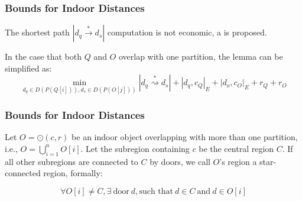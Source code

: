 
\begin{frame}
\frametitle{Bounds for Indoor Distances}

\textrm{The shortest path $|d_q \overset{*}{\rightarrow} d_s|$ computation is not economic, a  is proposed. }

\begin{lemma}
\end{lemma}

\textrm{In the case that both $Q$ and $O$ overlap with one partition, the lemma can be simplified as:}
\begin{equation}
  \min_{d_q \in D(P(Q[i])), d_s \in D(P(O[j]))} |d_q \overset{*}{\rightsquigarrow} d_s| + |d_q, c_Q|_E + |d_o, c_O|_E + r_Q + r_O
  \label{equation:simplified_2}
\end{equation}

\end{frame}


\begin{frame}
\frametitle{Bounds for Indoor Distances}


\begin{definition}

  Let $O = \odot(c, r)$ be an indoor object overlapping with more than one partition, i.e., $O = \bigcup_{i=1}^{n}O[i]$. Let the subregion containing $c$ be the central region $C$. If all other subregions are connected to $C$ by doors, we call $O$'s region a star-connected region, formally:

  \begin{equation*}
    \forall O[i] \neq C, \exists~\text{door}~d , \text{such that}~d \in C~\text{and}~d \in O[i]
  \end{equation*}

\end{definition}


\end{frame}

